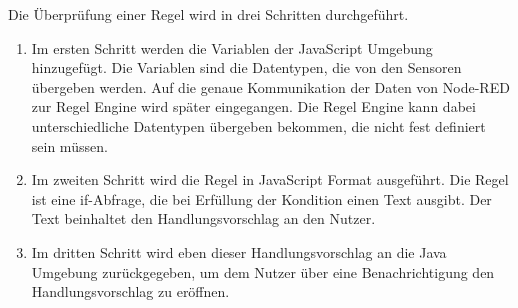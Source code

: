 Die Überprüfung einer Regel wird in drei Schritten durchgeführt.
\begin{enumerate}
\item Im ersten Schritt werden die Variablen der JavaScript Umgebung hinzugefügt. Die Variablen sind die Datentypen, die von den Sensoren übergeben werden. Auf die genaue Kommunikation der Daten von Node-RED zur Regel Engine wird später eingegangen. Die Regel Engine kann dabei unterschiedliche Datentypen übergeben bekommen, die nicht fest definiert sein müssen. 
\item Im zweiten Schritt wird die Regel in JavaScript Format ausgeführt. Die Regel ist eine if-Abfrage, die bei Erfüllung der Kondition einen Text ausgibt. Der Text beinhaltet den Handlungsvorschlag an den Nutzer.
\item Im dritten Schritt wird eben dieser Handlungsvorschlag an die Java Umgebung zurückgegeben, um dem Nutzer über eine Benachrichtigung den Handlungsvorschlag zu eröffnen.
\end{enumerate}

